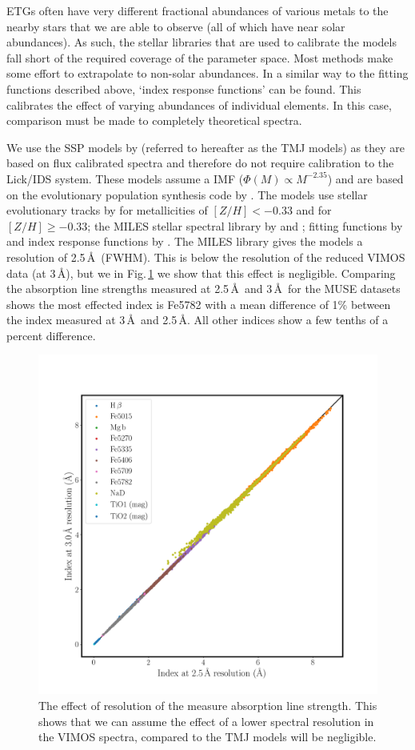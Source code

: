 			ETGs often have very different fractional abundances of various metals to the nearby stars that we are able to observe (all of which have near solar abundances). As such, the stellar libraries that are used to calibrate the models fall short of the required coverage of the parameter space. Most methods make some effort to extrapolate to non-solar abundances. In a similar way to the fitting functions described above, `index response functions' can be found. This calibrates the effect of varying abundances of individual elements. In this case, comparison must be made to completely theoretical spectra.

			We use the SSP models by \citet{Thomas2010} (referred to hereafter as the TMJ models) as they are based on flux calibrated spectra and therefore do not require calibration to the Lick/IDS system. These models assume a \citet{Salpeter1955} IMF ($\Phi(M) \propto M^{-2.35}$) and are based on the evolutionary population synthesis code by \citet{Maraston1998}. The models use stellar evolutionary tracks by \citet{Cassisi1997} for metallicities of $[Z/H] < -0.33$ and \citet{Girardi2000} for $[Z/H] \ge -0.33$; the MILES stellar spectral library by \citet{Sanchez-Blazquez2006a} and \citet{Falcon-Barroso2011a}; fitting functions by \citet{Johansson2010} and index response functions by \citet{Korn2005}. The MILES library gives the models a resolution of 2.5\,\AA\ (FWHM). This is below the resolution of the reduced VIMOS data (at 3\,\AA), but we in Fig.\,\ref{fig:res} we show that this effect is negligible. Comparing the absorption line strengths measured at 2.5\,\AA\ and 3\,\AA\ for the MUSE datasets shows the most effected index is Fe5782 with a mean difference of 1\% between the index measured at 3\,\AA\ and 2.5\,\AA. All other indices show a few tenths of a percent difference. 

			\begin{figure}
				\centering
				\includegraphics[width=.7\textwidth]{chapter2/compare_resolutions.png}
				\caption[Affect of resolution on absorption line index strength]{The effect of resolution of the measure absorption line strength. This shows that we can assume the effect of a lower spectral resolution in the VIMOS spectra, compared to the TMJ models will be negligible.}
				\label{fig:res}
			\end{figure}

